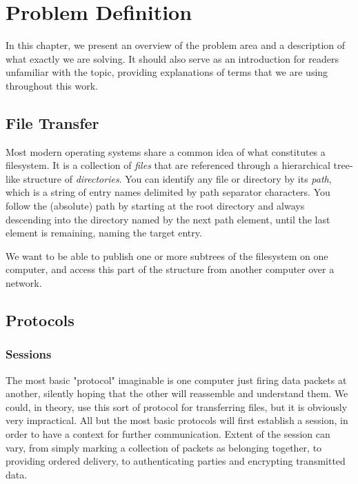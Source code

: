 
\chapter{Problem Definition}

In this chapter, we present an overview of the problem area and a description of what exactly we are solving.
It should also serve as an introduction for readers unfamiliar with the topic, providing explanations of terms
that we are using throughout this work.


\section{File Transfer}

Most modern operating systems share a common idea of what constitutes a filesystem. It is a collection of {\it
files} that are referenced through a hierarchical tree-like structure of {\it directories}. You can identify
any file or directory by its {\it path}, which is a string of entry names delimited by path separator
characters\footnotemark[1]. You follow the (absolute) path by starting at the root directory and always
descending into the directory named by the next path element, until the last element is remaining, naming the
target entry.

We want to be able to publish one or more subtrees of the filesystem on one computer, and access this part of
the structure from another computer over a network.


\section{Protocols}


\subsection{Sessions}

The most basic "protocol" imaginable is one computer just firing data packets at another, silently hoping that
the other will reassemble and understand them. We could, in theory, use this sort of protocol for transferring
files, but it is obviously very impractical. All but the most basic protocols will first establish a session,
in order to have a context for further communication. Extent of the session can vary, from simply marking
a collection of packets as belonging together, to providing ordered delivery, to authenticating parties and
encrypting transmitted data.

